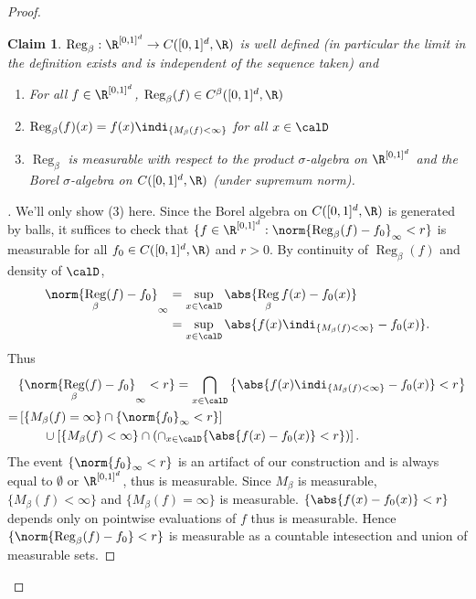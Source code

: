 \documentclass[fontsize=12pt, DIV=10]{scrreprt}
\theoremstyle{mydefn}
\newtheorem{claim}{Claim}
\theoremstyle{remark}
\newenvironment{subproof}[1][\proofname]{%
  \renewcommand{\qedsymbol}{$\blacksquare$}%
  \begin{proof}[#1]%
}{%
  \end{proof}%
}
\DeclareMathOperator{\reg}{Reg}
\begin{document}
\begin{proof}
\begin{claim}
		$\reg_{\beta}: \boxspace \to C([0, 1]^d, \R)$ is well defined (in particular the limit in the definition exists and is independent of the sequence taken) and 
		\begin{enumerate}
			\item For all $f \in \boxspace$, $\reg_{\beta}(f) \in C^{\beta}([0, 1]^d, \R)$
			\item $\reg_{\beta}(f)(x) = f(x) \regindi$ for all $x \in \calD$
			\item $\reg_{\beta}$ is measurable with respect to the product $\sigma$-algebra on $\boxspace$ and the Borel $\sigma$-algebra on $C([0, 1]^d, \R)$ (under supremum norm).
		\end{enumerate}
	\end{claim}
	\begin{subproof}
	We'll only show (3) here. Since the Borel algebra on $C([0, 1]^d, \R)$ is generated by balls, it suffices to check that $\{f \in \boxspace : \norm{\reg_{\beta}(f) - f_0}_{\infty} < r\}$ is measurable for all $f_0 \in C([0, 1]^d, \R)$ and $r > 0$. By continuity of $\reg_{\beta}(f)$ and density of $\calD$,
	\begin{align}
		\norm{\reg_{\beta}(f) - f_0}_{\infty}
		&= \sup_{x \in \calD} \abs{\reg_{\beta}f(x) - f_0(x)} \\
		&= \sup_{x \in \calD} \abs{f(x) \regindi - f_0(x)}.
	\end{align}
	Thus
	\begin{align}
		&\{\norm{\reg_{\beta}(f) - f_0}_{\infty} < r\}
		= \bigcap_{x \in \calD} \left\{ \abs{f(x) \regindi - f_0(x)} < r \right\} \\
		=& \left[ \{M_{\beta}(f) = \infty\} \cap \{\norm{f_0}_{\infty} < r\} \right] \nonumber \\
		 & \qquad \cup \left[ \{M_{\beta}(f) < \infty\} \cap \left( \cap_{x \in \calD} \{\abs{f(x) - f_0(x)} < r\} \right) \right].
	\end{align}
	The event $\{\norm{f_0}_{\infty} < r\}$ is an artifact of our construction and is always equal to $\emptyset$ or $\boxspace$, thus is measurable. Since $M_{\beta}$ is measurable, $\{M_{\beta}(f) < \infty\}$ and $\{M_{\beta}(f) = \infty\}$ is measurable. $\{\abs{f(x) - f_0(x)} < r\}$ depends only on pointwise evaluations of $f$ thus is measurable. Hence $\{\norm{\reg_{\beta}(f) - f_0} < r\}$ is measurable as a countable intesection and union of measurable sets.
	\end{subproof}


\end{proof}
\end{document}
